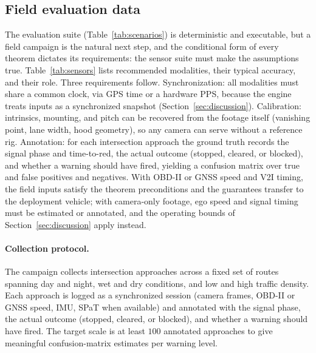 \documentclass[conference, a4paper]{IEEEtran}
\theoremstyle{plain}
\begin{document}
\subsection{Field evaluation data}
The evaluation suite (Table~\ref{tab:scenarios}) is deterministic and
executable, but a field campaign is the natural next step, and the
conditional form of every theorem dictates its requirements: the sensor
suite must make the assumptions true. Table~\ref{tab:sensors} lists
recommended modalities, their typical accuracy, and their role. Three
requirements follow. Synchronization: all modalities must share a common
clock, via GPS time or a hardware PPS, because the engine treats inputs as
a synchronized snapshot (Section~\ref{sec:discussion}). Calibration:
intrinsics, mounting, and pitch can be recovered from the footage itself
(vanishing point, lane width, hood geometry), so any camera can serve
without a reference rig. Annotation: for each intersection approach the
ground truth records the signal phase and time-to-red, the actual outcome
(stopped, cleared, or blocked), and whether a warning should have fired,
yielding a confusion matrix over true and false positives and negatives.
With OBD-II or GNSS speed and V2I timing, the field inputs satisfy the
theorem preconditions and the guarantees transfer to the deployment
vehicle; with camera-only footage, ego speed and signal timing must be
estimated or annotated, and the operating bounds of
Section~\ref{sec:discussion} apply instead.

\paragraph{Collection protocol.} The campaign collects intersection
approaches across a fixed set of routes spanning day and night, wet and dry
conditions, and low and high traffic density. Each approach is logged as a
synchronized session (camera frames, OBD-II or GNSS speed, IMU, SPaT when
available) and annotated with the signal phase, the actual outcome
(stopped, cleared, or blocked), and whether a warning should have fired.
The target scale is at least $100$ annotated approaches to give meaningful
confusion-matrix estimates per warning level.
\end{document}
